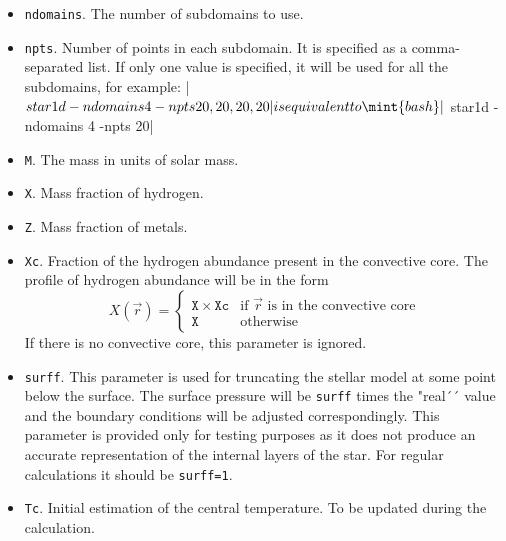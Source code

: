 \begin{itemize}
\item {\tt ndomains}. The number of subdomains to use.
\item {\tt npts}. Number of points in each subdomain. It is specified as a 
comma-separated list. 
If only one value is specified, it will be used for all the subdomains, for example:
|$ star1d -ndomains 4 -npts 20,20,20,20|  %
is equivalent to
\mint{bash}|$ star1d -ndomains 4 -npts 20|  %

\item {\tt M}. The mass in units of solar mass.
\item {\tt X}. Mass fraction of hydrogen.
\item {\tt Z}. Mass fraction of metals.
\item {\tt Xc}. Fraction of the hydrogen abundance present in the convective core. The profile
of hydrogen abundance will be in the form
$$X(\vec r)=\left\{
\begin{array}{ll}
\mathtt{X}\times \mathtt{Xc}&\mbox{if $\vec r$ is in the convective core}\\
\mathtt{X}&\mbox{otherwise}
\end{array}\right.$$
If there is no convective core, this parameter is ignored.

\item {\tt surff}. This parameter is used for truncating the stellar model
at some point below the surface. The surface pressure will be {\tt surff}
times the "real´´ value and the boundary conditions will be adjusted
correspondingly. This parameter is provided only for testing purposes as
it does not produce an accurate representation of the internal layers
of the star. For regular calculations it should be {\tt surff=1}.

\item {\tt Tc}. Initial estimation of the central temperature. To be
updated during the calculation.


\end{itemize}
